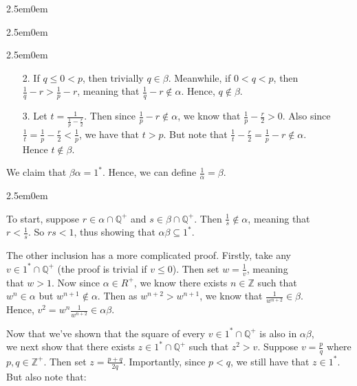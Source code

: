 \documentclass{book}
\newcommand{\exP}{%
   \color{Purple}%
   \fontsize{12}{14}\selectfont%
}
\newenvironment{myIndent}{%
   \begin{adjustwidth}{2.5em}{0em}%
}{%
   \end{adjustwidth}%
}
\newcommand{\retTwo}{\hfill\bigbreak}
\begin{document}
\begin{myIndent}
\begin{myIndent}
\begin{myIndent}
            \begin{enumerate}
               \item[2.] If $q \leq 0 < p$, then trivially $q \in \beta$. Meanwhile, if $0 < q < p$, then\\ [2pt] $\frac{1}{q} - r > \frac{1}{p} - r$, meaning that $\frac{1}{q} - r \notin \alpha$. Hence, $q \notin \beta$.\retTwo
               
               \item[3.] Let $t = \frac{1}{\frac{1}{p} - \frac{r}{2}}$. Then since $\frac{1}{p} - r \notin \alpha$, we know that $\frac{1}{p} - \frac{r}{2} > 0$. Also since $\frac{1}{t} = \frac{1}{p} - \frac{r}{2} < \frac{1}{p}$, we have that $t > p$. But note that $\frac{1}{t} - \frac{r}{2} = \frac{1}{p} - r \notin \alpha$.\\[2pt] Hence $t \notin \beta$.\retTwo
            \end{enumerate}
         \end{myIndent}

         We claim that $\beta\alpha = 1^*$. Hence, we can define $\frac{1}{\alpha} = \beta$.

         \begin{myIndent}\exP
            To start, suppose $r \in \alpha \cap \mathbb{Q}^+$ and $s \in \beta \cap \mathbb{Q}^+$. Then $\frac{1}{s} \notin \alpha$, meaning that\\ $r < \frac{1}{s}$. So $rs < 1$, thus showing that $\alpha\beta \subseteq 1^*$.\retTwo

            The other inclusion has a more complicated proof. Firstly, take any\\ $v \in 1^* \cap \mathbb{Q}^+$ (the proof is trivial if $v \leq 0$). Then set $w = \frac{1}{v}$, meaning\\ that $w > 1$. Now since $\alpha \in R^+$, we know there exists $n \in \mathbb{Z}$ such that\\ $w^n \in \alpha$ but $w^{n+1} \notin \alpha$. Then as $w^{n+2} > w^{n+1}$, we know that $\frac{1}{w^{n+2}} \in \beta$.\\ Hence, $v^2 = w^n \frac{1}{w^{n+2}} \in \alpha\beta$.\retTwo

            Now that we've shown that the square of every $v \in 1^* \cap \mathbb{Q}^+$ is also in $\alpha\beta$,\\ [2pt] we next show that there exists $z \in 1^* \cap \mathbb{Q}^+$ such that $z^2 > v$. Suppose $v = \frac{p}{q}$ where $p, q \in \mathbb{Z}^+$. Then set $z = \frac{p + q}{2q}$. Importantly, since $p < q$, we still have that $z \in 1^*$. But also note that:


\end{myIndent}
\end{myIndent}
\end{myIndent}
\end{document}
